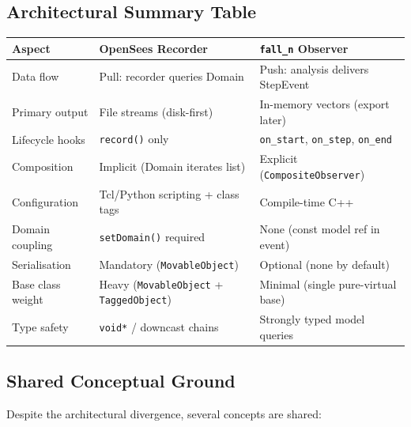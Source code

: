 \subsection{Architectural Summary Table}
\label{sec:comparison-table}

\begin{center}
\small
\begin{tabular}{p{3.8cm}p{5cm}p{5cm}}
\toprule
\textbf{Aspect} & \textbf{OpenSees Recorder} & \textbf{\texttt{fall\_n} Observer} \\
\midrule
Data flow
  & Pull: recorder queries Domain
  & Push: analysis delivers StepEvent \\
\addlinespace
Primary output
  & File streams (disk-first)
  & In-memory vectors (export later) \\
\addlinespace
Lifecycle hooks
  & \texttt{record()} only
  & \texttt{on\_start}, \texttt{on\_step}, \texttt{on\_end} \\
\addlinespace
Composition
  & Implicit (Domain iterates list)
  & Explicit (\texttt{CompositeObserver}) \\
\addlinespace
Configuration
  & Tcl/Python scripting + class tags
  & Compile-time C++ \\
\addlinespace
Domain coupling
  & \texttt{setDomain()} required
  & None (const model ref in event) \\
\addlinespace
Serialisation
  & Mandatory (\texttt{MovableObject})
  & Optional (none by default) \\
\addlinespace
Base class weight
  & Heavy (\texttt{MovableObject} + \texttt{TaggedObject})
  & Minimal (single pure-virtual base) \\
\addlinespace
Type safety
  & \texttt{void*} / downcast chains
  & Strongly typed model queries \\
\bottomrule
\end{tabular}
\end{center}

\subsection{Shared Conceptual Ground}
\label{sec:comparison-shared}

Despite the architectural divergence, several concepts are shared:

